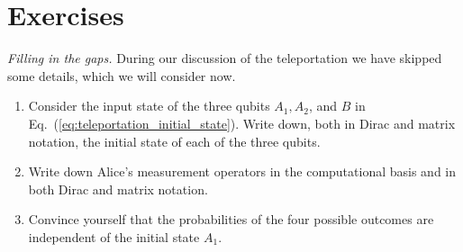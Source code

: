 \newpage
\section{Exercises}

\begin{exercise}
\emph{Filling in the gaps.} During our discussion of the teleportation we have skipped some details, which we will consider now.
\begin{enumerate}[label=(\alph*)]
    \item Consider the input state of the three qubits $A_1,A_2$, and $B$ in Eq.~(\ref{eq:teleportation_initial_state}). Write down, both in Dirac and matrix notation, the initial state of each of the three qubits.
    \item Write down Alice's measurement operators in the computational basis and in both Dirac and matrix notation.
    \item Convince yourself that the probabilities of the four possible outcomes are independent of the initial state $A_1$.
\end{enumerate}
\end{exercise}
